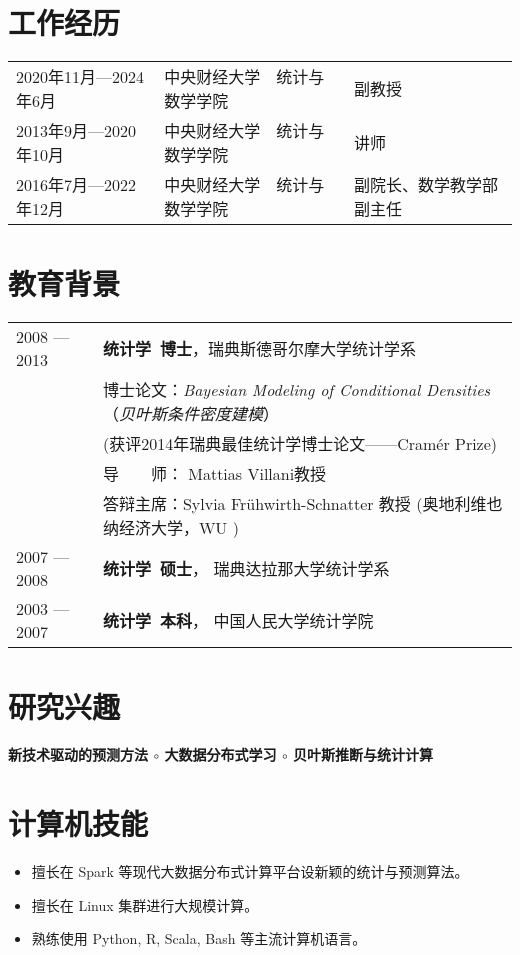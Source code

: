 \documentclass[twoside,a4paper,11pt]{article}
\begin{document}
\section{工作经历}

\begin{tabular}{lll}
2020年11月—2024年6月 & 中央财经大学　统计与数学学院 & 副教授 \\
2013年9月—2020年10月 & 中央财经大学　统计与数学学院 & 讲师    \\
2016年7月—2022年12月 & 中央财经大学　统计与数学学院 & 副院长、数学教学部副主任
\end{tabular}

\section{教育背景}

\begin{tabular}{ l  p{}}
  2008 --- 2013 & \textbf{统计学~博士}，瑞典斯德哥尔摩大学统计学系 \\
                & 博士论文：\emph{Bayesian Modeling of Conditional Densities}（\emph{贝叶斯条件密度建模}） \\
                & (获评2014年瑞典最佳统计学博士论文——Cramér Prize) \\
                & 导　　师： Mattias Villani教授        \\
                & 答辩主席：Sylvia Frühwirth-Schnatter 教授 (奥地利维也纳经济大学，WU ) \\
  2007 --- 2008 & \textbf{统计学~硕士}， 瑞典达拉那大学统计学系 \\
  2003 --- 2007 & \textbf{统计学~本科}， 中国人民大学统计学院    \\
\end{tabular}

\section{研究兴趣}

\textbf{新技术驱动的预测方法 $\circ$  大数据分布式学习 $\circ$ 贝叶斯推断与统计计算}

\section{计算机技能}
\begin{itemize}

\item 擅长在 Spark 等现代大数据分布式计算平台设新颖的统计与预测算法。
\item 擅长在 Linux 集群进行大规模计算。
\item 熟练使用 Python, R, Scala, Bash 等主流计算机语言。
\end{itemize}
\end{document}
